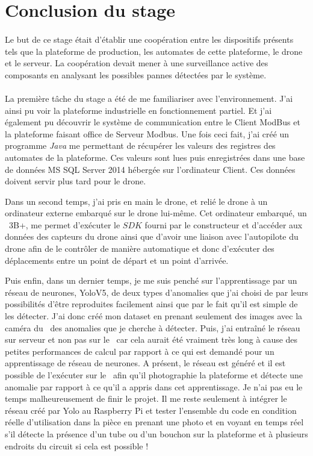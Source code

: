 \section{Conclusion du stage}
    \paragraph*{}
    Le but de ce stage était d'établir une coopération entre les dispositifs présents tels que la plateforme de production, les automates de cette plateforme, le drone et le serveur. La coopération devait mener à une surveillance active des composants en analysant les possibles pannes détectées par le système.
    
    \paragraph*{}
    La première tâche du stage a été de me familiariser avec l'environnement. J'ai ainsi pu voir la plateforme industrielle en fonctionnement partiel. Et j'ai également pu découvrir le système de communication entre le Client ModBus et la plateforme faisant office de Serveur Modbus.
    Une fois ceci fait, j'ai créé un programme \textit{Java} me permettant de récupérer les valeurs des registres des automates de la plateforme. Ces valeurs sont lues puis enregistrées dans une base de données MS SQL Server 2014 hébergée sur l'ordinateur Client. Ces données doivent servir plus tard pour le drone.
    
    Dans un second temps, j'ai pris en main le drone, et relié le drone à un ordinateur externe embarqué sur le drone lui-même. Cet ordinateur embarqué, un \rpi ~3B+, me permet d'exécuter le $SDK$ fourni par le constructeur et d'accéder aux données des capteurs du drone ainsi que d'avoir une liaison avec l'autopilote du drone afin de le contrôler de manière automatique et donc d'exécuter des déplacements entre un point de départ et un point d'arrivée.
    
    Puis enfin, dans un dernier temps, je me suis penché sur l'apprentissage par un réseau de neurones, YoloV5, de deux types d'anomalies que j'ai choisi de par leurs possibilités d'être reproduites facilement ainsi que par le fait qu'il est simple de les détecter. J'ai donc créé mon dataset en prenant seulement des images avec la caméra du \rpi ~des anomalies que je cherche à détecter. Puis, j'ai entraîné le réseau sur serveur et non pas sur le \rpi ~car cela aurait été vraiment très long à cause des petites performances de calcul par rapport à ce qui est demandé pour un apprentissage de réseau de neurones. A présent, le réseau est généré et il est possible de l'exécuter sur le \rpi ~afin qu'il photographie la plateforme et détecte une anomalie par rapport à ce qu'il a appris dans cet apprentissage. Je n'ai pas eu le temps malheureusement de finir le projet. Il me reste seulement à intégrer le réseau créé par Yolo au Raspberry Pi et tester l'ensemble du code en condition réelle d'utilisation dans la pièce en prenant une photo et en voyant en temps réel s'il détecte la présence d'un tube ou d'un bouchon sur la plateforme et à plusieurs endroits du circuit si cela est possible !
    
